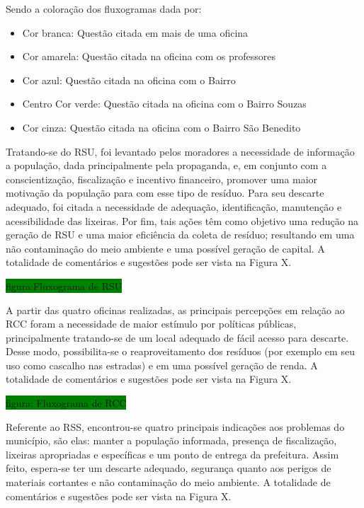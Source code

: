 	Sendo a coloração dos fluxogramas dada por:
	
	\begin{itemize}
	\item Cor branca: Questão citada em mais de uma oficina
	\item Cor amarela: Questão citada na oficina com os professores
	\item Cor azul: Questão citada na oficina com o Bairro 
	\item Centro Cor verde: Questão citada na oficina com o Bairro Souzas
	\item Cor cinza: Questão citada na oficina com o Bairro São Benedito
	\end{itemize}
	
	Tratando-se do RSU, foi levantado pelos moradores a necessidade de informação a população, dada principalmente pela propaganda, e, em conjunto com a conscientização, fiscalização e incentivo financeiro, promover uma maior motivação da população para com esse tipo de resíduo. Para seu descarte adequado, foi citada a necessidade de adequação, identificação, manutenção e acessibilidade das lixeiras. Por fim, tais ações têm como objetivo uma redução na geração de RSU e uma maior eficiência da coleta de resíduo; resultando em uma não contaminação do meio ambiente e uma possível geração de capital. A totalidade de comentários e sugestões pode ser vista na Figura X.
	
	\colorbox{green}{figura:Fluxograma de RSU}
	
	A partir das quatro oficinas realizadas, as principais percepções em relação ao RCC foram a necessidade de maior estímulo por políticas públicas, principalmente tratando-se de um local adequado de fácil acesso para descarte. Desse modo, possibilita-se o reaproveitamento dos resíduos (por exemplo em seu uso como cascalho nas estradas) e em uma possível geração de renda. A totalidade de comentários e sugestões pode ser vista na Figura X.
	
	\colorbox{green}{figura: Fluxograma de RCC}
	
	Referente ao RSS, encontrou-se quatro principais indicações aos problemas do município, são elas: manter a população informada, presença de fiscalização, lixeiras apropriadas e específicas e um ponto de entrega da prefeitura. Assim feito, espera-se ter um descarte adequado, segurança quanto aos perigos de materiais cortantes e não contaminação do meio ambiente. A totalidade de comentários e sugestões pode ser vista na Figura X.
	
